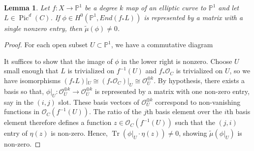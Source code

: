 \documentclass[12pt]{amsart}
\newcommand{\pp}{\mathbb{P}}
\renewcommand{\O}{\mathscr{O}}
\renewcommand{\tilde}{\widetilde}
\newtheorem{Lemma}[theorem]{Lemma}
\DeclareMathOperator{\Pic}{Pic}
\DeclareMathOperator{\tr}{Tr}
\theoremstyle{definition}
\theoremstyle{remark}
\theoremstyle{remark}
\numberwithin{equation}{section}
\begin{document}
\begin{Lemma} \label{nz}
Let $f\colon  X \rightarrow \pp^1$ be a degree $k$ map of an elliptic curve to $\pp^1$ and let $L \in \Pic^d(C)$.
If $\phi \in H^0(\pp^1, End(f_*L))$ is represented by a matrix with a single nonzero entry, then $\tilde{\mu}(\phi) \neq 0$. 
\end{Lemma}
\begin{proof}
For each open subset $U \subset \pp^1$, we have a commutative diagram
\begin{center}
\end{center}
It suffices to show that the image of $\phi$ in the lower right is nonzero.
Choose $U$ small enough that $L$ is trivialized on $f^{-1}(U)$ and $f_*\O_C$ is trivialized on $U$, so
we have isomorphisms $(f_*L)|_U \cong (f_*\O_C)|_U \cong \O_{U}^{\oplus k}$. By hypothesis, there exists a basis so that, $\phi|_U : \O_U^{\oplus k} \rightarrow \O_U^{\oplus k}$ is represented by a matrix with one non-zero entry, say in the $(i, j)$ slot. These basis vectors of $\O_U^{\oplus k}$ correspond to non-vanishing functions in $\O_C(f^{-1}(U))$. The ratio of the $j$th basis element over the $i$th basis element therefore defines a function $z \in \O_C(f^{-1}(U))$ such that the $(j, i)$ entry of $\eta(z)$ is non-zero.
Hence, $\tr(\phi|_U \cdot \eta(z)) \neq 0$, showing $\tilde{\mu}(\phi|_U)$ is non-zero.
\end{proof}
\end{document}
